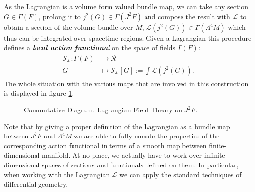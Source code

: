 As the Lagrangian is a volume form valued bundle map, we can take any section $G \in \Gamma(F)$, prolong it to $j^2(G) \in \Gamma(J^2F)$ and compose the result with $\mathcal{L}$ to obtain a section of the volume bundle over $M$, $\mathcal{L}(j^2(G)) \in \Gamma(\Lambda^4M)$ which thus can be integrated over spacetime regions. Given a Lagrangian this procedure defines a \textit{\textbf{local action functional}} on the space of fields $\Gamma(F)$:
\begin{align}
\begin{aligned}
    \mathcal{S}_{\mathcal{L}} : \Gamma(F) &\longrightarrow \mathcal{R} \\
    G &\longmapsto \mathcal{S}_{\mathcal{L}}[G] := \int \mathcal{L}(j^2(G)).
\end{aligned}
\end{align}
The whole situation with the various maps that are involved in this construction is displayed in figure \ref{diagram1}. 
\begin{figure}[hbt!]
\centering
{}
\caption{Commutative Diagram: Lagrangian Field Theory on $J^2F$.} \label{diagram1}
\end{figure}
Note that by giving a proper definition of the Lagrangian as a bundle map between $J^2F$ and $\Lambda^4M$ we are able to fully encode the properties of the corresponding action functional in terms of a smooth map between finite-dimensional manifold. At no place, we actually have to work over infinite-dimensional spaces of sections and functionals defined on them. In particular, when working with the Lagrangian $\mathcal{L}$ we can apply the standard techniques of differential geometry. 
